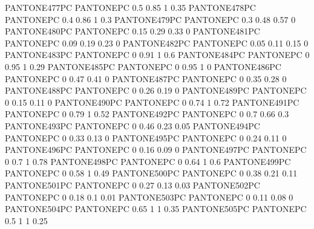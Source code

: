  {PANTONE477PC} {PANTONE\SpotSpace PC} {0.5 0.85 1 0.35}
 {PANTONE478PC} {PANTONE\SpotSpace PC} {0.4 0.86 1 0.3}
 {PANTONE479PC} {PANTONE\SpotSpace PC} {0.3 0.48 0.57 0}
 {PANTONE480PC} {PANTONE\SpotSpace PC} {0.15 0.29 0.33 0}
 {PANTONE481PC} {PANTONE\SpotSpace PC} {0.09 0.19 0.23 0}
 {PANTONE482PC} {PANTONE\SpotSpace PC} {0.05 0.11 0.15 0}
 {PANTONE483PC} {PANTONE\SpotSpace PC} {0 0.91 1 0.6}
 {PANTONE484PC} {PANTONE\SpotSpace PC} {0 0.95 1 0.29}
 {PANTONE485PC} {PANTONE\SpotSpace PC} {0 0.95 1 0}
 {PANTONE486PC} {PANTONE\SpotSpace PC} {0 0.47 0.41 0}
 {PANTONE487PC} {PANTONE\SpotSpace PC} {0 0.35 0.28 0}
 {PANTONE488PC} {PANTONE\SpotSpace PC} {0 0.26 0.19 0}
 {PANTONE489PC} {PANTONE\SpotSpace PC} {0 0.15 0.11 0}
 {PANTONE490PC} {PANTONE\SpotSpace PC} {0 0.74 1 0.72}
 {PANTONE491PC} {PANTONE\SpotSpace PC} {0 0.79 1 0.52}
 {PANTONE492PC} {PANTONE\SpotSpace PC} {0 0.7 0.66 0.3}
 {PANTONE493PC} {PANTONE\SpotSpace PC} {0 0.46 0.23 0.05}
 {PANTONE494PC} {PANTONE\SpotSpace PC} {0 0.33 0.13 0}
 {PANTONE495PC} {PANTONE\SpotSpace PC} {0 0.24 0.11 0}
 {PANTONE496PC} {PANTONE\SpotSpace PC} {0 0.16 0.09 0}
 {PANTONE497PC} {PANTONE\SpotSpace PC} {0 0.7 1 0.78}
 {PANTONE498PC} {PANTONE\SpotSpace PC} {0 0.64 1 0.6}
 {PANTONE499PC} {PANTONE\SpotSpace PC} {0 0.58 1 0.49}
 {PANTONE500PC} {PANTONE\SpotSpace PC} {0 0.38 0.21 0.11}
 {PANTONE501PC} {PANTONE\SpotSpace PC} {0 0.27 0.13 0.03}
 {PANTONE502PC} {PANTONE\SpotSpace PC} {0 0.18 0.1 0.01}
 {PANTONE503PC} {PANTONE\SpotSpace PC} {0 0.11 0.08 0}
 {PANTONE504PC} {PANTONE\SpotSpace PC} {0.65 1 1 0.35}
 {PANTONE505PC} {PANTONE\SpotSpace PC} {0.5 1 1 0.25}
